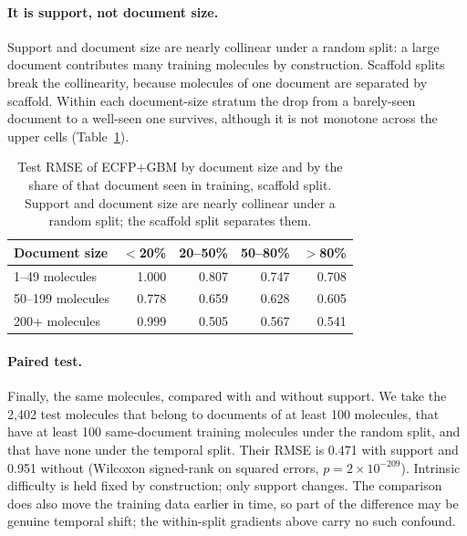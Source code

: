 \paragraph{It is support, not document size.} Support and document size are nearly collinear under a random split: a large document contributes many training molecules by construction. Scaffold splits break the collinearity, because molecules of one document are separated by scaffold. Within each document-size stratum the drop from a barely-seen document to a well-seen one survives, although it is not monotone across the upper cells (Table~\ref{tab:strata}).

\begin{table}[ht]
\centering\small
\caption{Test RMSE of ECFP+GBM by document size and by the share of that document seen in training, scaffold split. Support and document size are nearly collinear under a random split; the scaffold split separates them.}
\label{tab:strata}
\begin{tabular}{lrrrr}
\toprule
Document size & $<$20\% & 20--50\% & 50--80\% & $>$80\% \\
\midrule
1--49 molecules   & 1.000 & 0.807 & 0.747 & 0.708 \\
50--199 molecules & 0.778 & 0.659 & 0.628 & 0.605 \\
200+ molecules    & 0.999 & 0.505 & 0.567 & 0.541 \\
\bottomrule
\end{tabular}
\end{table}

\paragraph{Paired test.} Finally, the same molecules, compared with and without support. We take the 2{,}402 test molecules that belong to documents of at least 100 molecules, that have at least 100 same-document training molecules under the random split, and that have none under the temporal split. Their RMSE is 0.471 with support and 0.951 without (Wilcoxon signed-rank on squared errors, $p=2\times10^{-209}$). Intrinsic difficulty is held fixed by construction; only support changes. The comparison does also move the training data earlier in time, so part of the difference may be genuine temporal shift; the within-split gradients above carry no such confound.

